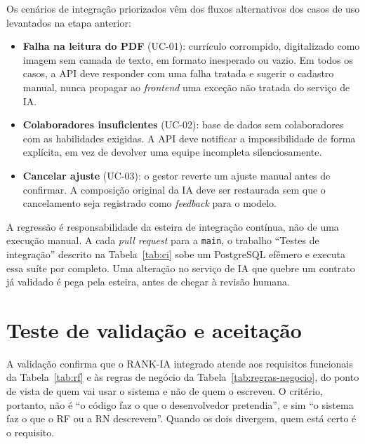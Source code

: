 \documentclass[a4paper,12pt,oneside,openany]{book}
\newif\iforientacoes
\newcommand{\orientacao}[1]{%
    \iforientacoes
        \begin{quote}
        \small\itshape\textbf{Orientação:} #1
        \end{quote}
    \fi
}
\begin{document}
Os cenários de integração priorizados vêm dos fluxos alternativos dos casos de
uso levantados na etapa anterior:

\begin{itemize}[nosep]
    \item \textbf{Falha na leitura do PDF} (UC-01): currículo corrompido,
    digitalizado como imagem sem camada de texto, em formato inesperado ou
    vazio. Em todos os casos, a API deve responder com uma falha tratada e
    sugerir o cadastro manual, nunca propagar ao \textit{frontend} uma exceção
    não tratada do serviço de IA.
    \item \textbf{Colaboradores insuficientes} (UC-02): base de dados sem
    colaboradores com as habilidades exigidas. A API deve notificar a
    impossibilidade de forma explícita, em vez de devolver uma equipe
    incompleta silenciosamente.
    \item \textbf{Cancelar ajuste} (UC-03): o gestor reverte um ajuste manual
    antes de confirmar. A composição original da IA deve ser restaurada sem que
    o cancelamento seja registrado como \textit{feedback} para o modelo.
\end{itemize}

A regressão é responsabilidade da esteira de integração contínua, não de uma
execução manual. A cada \textit{pull request} para a \texttt{main}, o trabalho
``Testes de integração'' descrito na Tabela~\ref{tab:ci} sobe um PostgreSQL
efêmero e executa essa suíte por completo. Uma alteração no serviço de IA que
quebre um contrato já validado é pega pela esteira, antes de chegar à revisão
humana.

\section{Teste de validação e aceitação}\label{sec:validacao}

\orientacao{Descrevam como a equipe verifica se o software atende aos
requisitos do ponto de vista do usuário, e como está prevista a aceitação
por parte de quem vai efetivamente usar o sistema.}

A validação confirma que o RANK-IA integrado atende aos requisitos funcionais
da Tabela~\ref{tab:rf} e às regras de negócio da
Tabela~\ref{tab:regras-negocio}, do ponto de vista de quem vai usar o sistema e
não de quem o escreveu. O critério, portanto, não é ``o código faz o que o
desenvolvedor pretendia'', e sim ``o sistema faz o que o RF ou a RN
descrevem''. Quando os dois divergem, quem está certo é o requisito.
\end{document}
